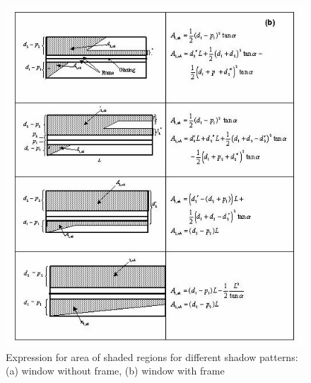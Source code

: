 \begin{figure}[htbp]
\centering
\includegraphics{media/image1606.png}
\caption{Expression for area of shaded regions for different shadow patterns: (a) window without frame, (b) window with frame}
\end{figure}

